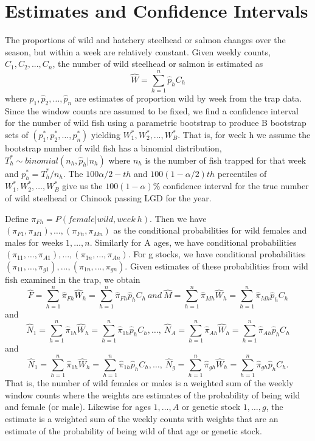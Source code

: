 \documentclass[12pt]{article}
\begin{document}
\section{Estimates and Confidence Intervals}
The proportions of wild and hatchery steelhead or salmon changes over the season, but within a week are relatively constant. Given weekly counts, \(C_1,C_2,...,C_n\),   the number of wild steelhead or salmon is estimated as
\[\hat{W}=\sum\limits_{h=1}^{n} \hat{p}_hC_h\]	  
where \(\hat{p}_1, \hat{p}_2, \ldots, \hat{p}_n \) are estimates of proportion wild by week from the trap data.  Since the window counts are assumed to be fixed, we find a confidence interval for the number of wild fish using a parametric  bootstrap to produce B bootstrap sets of \((p^*_1, p^*_2, \ldots, p^*_n)\) yielding \(W^*_1, W^*_2, \ldots, W^*_B\).   That is, for week h we assume the bootstrap number of wild fish has a binomial distribution,  \(T^*_h\sim binomial(n_h,\hat{p}_h|n_h)\) where \(n_h\)  is the number of fish trapped for that  week and \(p^*_h = T^*_h/n_h\).  The \(100\alpha/2-th\) and \(100(1- \alpha/2)th\) percentiles of \(W^*_1, W^*_2, \ldots, W^*_B\) give us the \(100(1-\alpha)\%\) confidence interval for the true number of wild steelhead or Chinook passing LGD for the year.

Define \(\pi_{Fh} = P(female|wild,week \: h)\).  Then we have \((\pi_{F1},\pi_{M1}),\ldots,(\pi_{Fn},\pi_{Mn})\) as the conditional probabilities for wild females and males for weeks \(1,\ldots,n\).  Similarly for A ages, we have conditional probabilities \((\pi_{11}, \ldots, \pi_{A1}), \ldots,(\pi_{1n}, \ldots, \pi_{An})\). For g stocks, we have conditional probabilities \((\pi_{11}, \ldots, \pi_{g1}), \ldots,(\pi_{1n}, \ldots, \pi_{gn})\). Given estimates of these probabilities from wild fish examined in the trap, we obtain  
\[\hat{F} =\sum\limits_{h=1}^{n}\hat{\pi}_{Fh}\hat{W}_h = \sum\limits_{h=1}^{n}\hat{\pi}_{Fh}\hat{p}_{h}C_h \ and   \ \hat{M} =\sum\limits_{h=1}^{n}\hat{\pi}_{Mh}\hat{W}_h = \sum\limits_{h=1}^{n}\hat{\pi}_{Mh}\hat{p}_{h}C_h \]
and
\[\hat{N}_1 =\sum\limits_{h=1}^{n}\hat{\pi}_{1h}\hat{W}_h = \sum\limits_{h=1}^{n}\hat{\pi}_{1h}\hat{p}_{h}C_h, \ldots, \ \hat{N}_A =\sum\limits_{h=1}^{n}\hat{\pi}_{Ah}\hat{W}_h = \sum\limits_{h=1}^{n}\hat{\pi}_{Ah}\hat{p}_{h}C_{h}\]
and
\[\hat{N}_1 =\sum\limits_{h=1}^{n}\hat{\pi}_{1h}\hat{W}_h = \sum\limits_{h=1}^{n}\hat{\pi}_{1h}\hat{p}_{h}C_h, \ldots, \ \hat{N}_g =\sum\limits_{h=1}^{n}\hat{\pi}_{gh}\hat{W}_h = \sum\limits_{h=1}^{n}\hat{\pi}_{gh}\hat{p}_{h}C_{h}.\]
That is, the number of wild females or males is a weighted sum of the weekly window counts where the weights are estimates of the probability of being wild and female (or male).  Likewise for ages \(1, \ldots, A\) or genetic stock \(1, \ldots, g\), the estimate is a weighted sum of the weekly counts with weights that are an estimate of the probability of being wild of that age or genetic stock.
\end{document}
